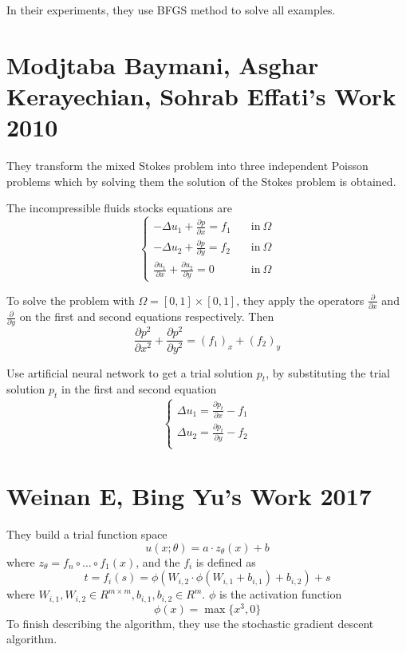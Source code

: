 In their experiments, they use BFGS method to solve all examples.

\section{Modjtaba Baymani, Asghar Kerayechian, Sohrab Effati's Work 2010}
They transform the mixed Stokes problem into three independent Poisson problems which by solving them the solution of the Stokes problem is obtained. 

The incompressible fluids stocks equations are
\begin{equation}
\left\{
 \begin{split}
  -\Delta u_1 + \frac{\partial p}{\partial x} = f_1 &\quad \mbox{in}\ \Omega\\
  -\Delta u_2 + \frac{\partial p}{\partial y} = f_2 &\quad \mbox{in}\ \Omega \\
  \frac{\partial u_1}{\partial x} + \frac{\partial u_2}{\partial y} = 0&\quad \mbox{in}\ \Omega 
 \end{split}\right.
\end{equation} 

To solve the problem with $\Omega = [0,1]\times [0,1]$, they apply the operators $\frac{\partial}{\partial x}$ and $\frac{\partial}{\partial y}$ on the first and second equations respectively. Then
\begin{equation}
\frac{\partial p^2}{\partial x^2}+\frac{\partial p^2}{\partial y^2} = (f_1)_x+(f_2)_y
\end{equation}

Use artificial neural network to get a trial solution $p_t$, by substituting the trial solution $p_t$ in the first and second equation
\begin{equation}
 \left\{
 \begin{split}
  \Delta u_1 = \frac{\partial p_t}{\partial x} - f_1\\
  \Delta u_2 = \frac{\partial p_t}{\partial y} - f_2\\
 \end{split}\right.
\end{equation}

\section{Weinan E, Bing Yu's Work 2017}

They build a trial function space 
\begin{equation}
 u(x;\theta) = a\cdot z_{\theta}(x) + b 
\end{equation}
where $z_\theta = f_n\circ ...\circ f_1(x)$, and the $f_i$ is defined as 
\begin{equation}
t = f_i(s) = \phi(W_{i,2}\cdot \phi(W_{i,1}+b_{i,1})+b_{i,2}) + s
\end{equation}
where $W_{i,1},W_{i,2}\in R^{m\times m},b_{i,1},b_{i,2}\in R^m$. $\phi$ is the activation function
\begin{equation}
\phi(x) = \max\{x^3,0\}
\end{equation}
To finish describing the algorithm, they use the stochastic gradient descent algorithm.

